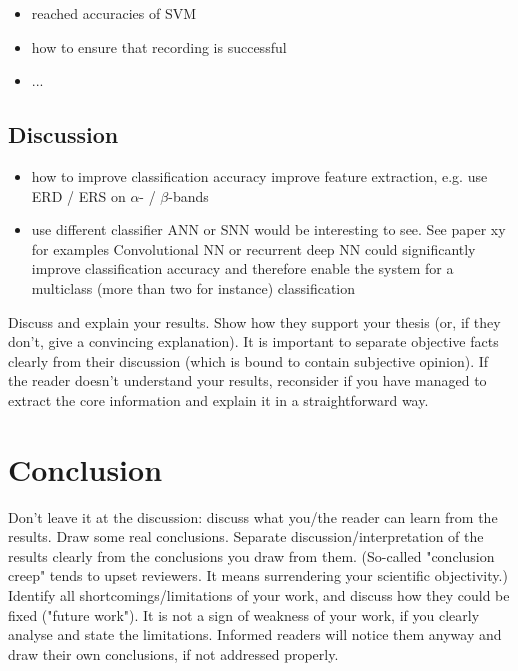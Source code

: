 \documentclass[a4paper,twoside, openright,12pt]{report}
\begin{document}
\begin{itemize}
	\item reached accuracies of SVM
	\item how to ensure that recording is successful  
	\item ...
\end{itemize}


\section{Discussion}
\begin{itemize}
	\item how to improve classification accuracy
	\subitem improve feature extraction, e.g. use ERD / ERS on $\alpha$- / $\beta$-bands 
	\item use different classifier 
	\subitem ANN or SNN would be interesting to see. See paper xy for examples
	\subitem Convolutional NN or recurrent deep NN could significantly improve classification accuracy and therefore enable the system for a multiclass (more than two for instance) classification 
\end{itemize}


Discuss and explain your results. Show how they support your thesis (or, if they don't, give a convincing explanation). It is important to separate objective facts clearly from their discussion (which is bound to contain subjective opinion). If the reader doesn't understand your results, reconsider if you have managed to extract the core information and explain it in a straightforward way.




\chapter{Conclusion}

Don't leave it at the discussion: discuss what you/the reader can learn from the results. Draw some real conclusions. Separate discussion/interpretation of the results clearly from the conclusions you draw from them. (So-called "conclusion creep" tends to upset reviewers. It means surrendering your scientific objectivity.) Identify all shortcomings/limitations of your work, and discuss how they could be fixed ("future work"). It is not a sign of weakness of your work, if you clearly analyse and state the limitations. Informed readers will notice them anyway and draw their own conclusions, if not addressed properly.
\end{document}
